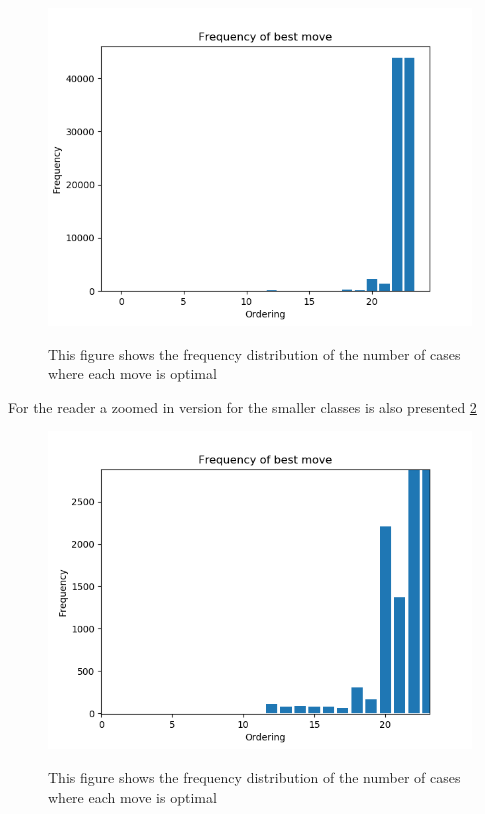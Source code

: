 \begin{figure}
\centering
\includegraphics[scale=0.75]{totalb1.png}\\
\caption{This figure shows the frequency distribution of the number of cases where each move is optimal}
\label{fig:totalb1}
\end{figure}

\par For the reader a zoomed in version for the smaller classes is also presented \ref{fig:totalb2}

\begin{figure}
\centering
\includegraphics[scale=0.75]{totalb2.png}\\
\caption{This figure shows the frequency distribution of the number of cases where each move is optimal}
\label{fig:totalb2}
\end{figure}

